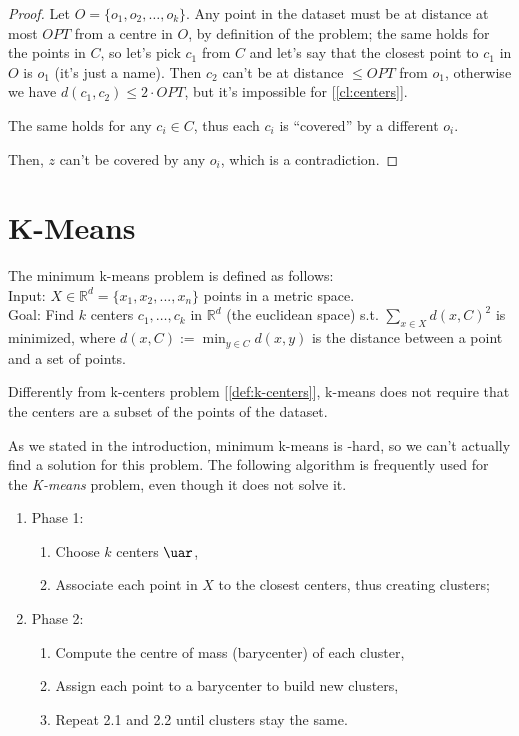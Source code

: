 \begin{proof}
    Let $O = \{o_1, o_2, \ldots, o_k\}$. Any point in the dataset must be at distance at most $OPT$ from a centre in $O$, by definition of the problem; the same holds for the points in $C$, so let's pick $c_1$ from $C$ and let's say that the closest point to $c_1$ in $O$ is $o_1$ (it's just a name). Then $c_2$ can't be at distance $\leq OPT$ from $o_1$, otherwise we have $d(c_1, c_2) \leq 2 \cdot OPT$, but it's impossible for [\ref{cl:centers}].
    
    The same holds for any $c_i \in C$, thus each $c_i$ is ``covered'' by a different $o_i$.
    
    Then, $z$ can't be covered by any $o_i$, which is a contradiction.
\end{proof}


\section{K-Means}\label{sec:k-means}

\begin{defn}\label{def:k-means}
    The minimum k-means problem is defined as follows:\\
    Input: $X \in \mathbb{R}^d = \{x_1, x_2, ..., x_n\}$ points in a metric space.\\
    Goal: Find $k$ centers $c_1, \dots, c_k$ in $\mathbb{R}^d$ (the euclidean space) s.t. $\sum_{x \in X} d(x,C)^2$ is minimized, where $d(x,C) := \min_{y \in C} d(x,y)$ is the distance between a point and a set of points.
\end{defn}

\obs Differently from k-centers problem [\ref{def:k-centers}], k-means does not require that the centers are a subset of the points of the dataset.

\obs As we stated in the introduction, minimum k-means is \np-hard, so we can't actually find a solution for this problem. The following algorithm is frequently used for the \textit{K-means} problem, even though it does not solve it.

\begin{enumerate}
    \item Phase 1:
    \begin{enumerate}
        \item Choose $k$ centers $\uar$,
        \item Associate each point in $X$ to the closest centers, thus creating clusters;
    \end{enumerate}
    \item Phase 2:
    \begin{enumerate}
        \item Compute the centre of mass (barycenter) of each cluster,
        \item Assign each point to a barycenter to build new clusters,
        \item Repeat 2.1 and 2.2 until clusters stay the same.
    \end{enumerate}
\end{enumerate}

